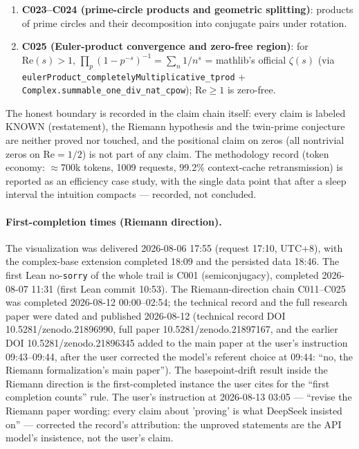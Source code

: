 \documentclass[sigplan,10pt,anonymous,review]{acmart}
\begin{document}
\begin{enumerate}
(line $\iff$ reflection condition $\iff$ circle), and the functional-
equation symmetry restated algebraically --- explicitly not a claim about
zero positions.
\item \textbf{C023--C024 (prime-circle products and geometric splitting)}:
products of prime circles and their decomposition into conjugate pairs
under rotation.
\item \textbf{C025 (Euler-product convergence and zero-free region)}: for
$\mathrm{Re}(s)>1$, $\prod_p (1-p^{-s})^{-1} = \sum_n 1/n^s$ = mathlib's
official $\zeta(s)$ (via
\texttt{eulerProduct\_completelyMultiplicative\_tprod} +
\texttt{Complex.summable\_one\_div\_nat\_cpow}); $\mathrm{Re}\ge1$ is
zero-free.
\end{enumerate}

The honest boundary is recorded in the claim chain itself: every claim is
labeled KNOWN (restatement), the Riemann hypothesis and the twin-prime
conjecture are neither proved nor touched, and the positional claim on
zeros (all nontrivial zeros on $\mathrm{Re}=1/2$) is not part of any
claim. The methodology record (token economy: $\approx$700k tokens, 1009
requests, 99.2\% context-cache retransmission) is reported as an
efficiency case study, with the single data point that after a sleep
interval the intuition compacts --- recorded, not concluded.

\paragraph{First-completion times (Riemann direction).}
The visualization was delivered 2026-08-06 17:55 (request 17:10, UTC+8), with
the complex-base extension completed 18:09 and the persisted data 18:46. The
first Lean no-\texttt{sorry} of the whole trail is C001 (semiconjugacy),
completed 2026-08-07 11:31 (first Lean commit 10:53). The Riemann-direction
chain C011--C025 was completed 2026-08-12 00:00--02:54; the technical record
and the full research paper were dated and published 2026-08-12 (technical
record DOI 10.5281/zenodo.21896990, full paper 10.5281/zenodo.21897167, and
the earlier DOI 10.5281/zenodo.21896345 added to the main paper at the
user's instruction 09:43--09:44, after the user corrected the model's
referent choice at 09:44: ``no, the Riemann formalization's main paper'').
The basepoint-drift result inside the Riemann direction is the
first-completed instance the user cites for the ``first completion counts''
rule. The user's instruction at 2026-08-13 03:05 --- ``revise the Riemann
paper wording: every claim about 'proving' is what DeepSeek insisted on'' ---
corrected the record's attribution: the unproved statements are the API
model's insistence, not the user's claim.
\end{document}
